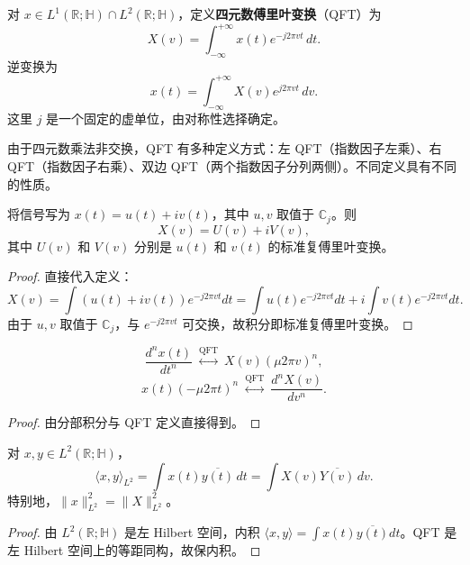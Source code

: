 \begin{definition}[四元数傅里叶变换]\label{def:q_fourier}
对 $x\in L^1(\mathbb{R};\mathbb{H})\cap L^2(\mathbb{R};\mathbb{H})$，定义\textbf{四元数傅里叶变换}（QFT）为
\[
X(v)=\int_{-\infty}^{+\infty}x(t)e^{-j2\pi vt}\,dt.
\]
逆变换为
\[
x(t)=\int_{-\infty}^{+\infty}X(v)e^{j2\pi vt}\,dv.
\]
这里 $j$ 是一个固定的虚单位，由对称性选择确定。
\end{definition}

\begin{remark}\label{rem:q_fourier_types}
由于四元数乘法非交换，QFT 有多种定义方式：左 QFT（指数因子左乘）、右 QFT（指数因子右乘）、双边 QFT（两个指数因子分列两侧）。不同定义具有不同的性质。
\end{remark}

\begin{proposition}\label{prop:q_fourier_complex_relation}
将信号写为 $x(t)=u(t)+iv(t)$，其中 $u,v$ 取值于 $\mathbb{C}_j$。则
\[
X(v)=U(v)+iV(v),
\]
其中 $U(v)$ 和 $V(v)$ 分别是 $u(t)$ 和 $v(t)$ 的标准复傅里叶变换。
\end{proposition}

\begin{proof}
直接代入定义：
\[
X(v)=\int(u(t)+iv(t))e^{-j2\pi vt}dt=\int u(t)e^{-j2\pi vt}dt+i\int v(t)e^{-j2\pi vt}dt.
\]
由于 $u,v$ 取值于 $\mathbb{C}_j$，与 $e^{-j2\pi vt}$ 可交换，故积分即标准复傅里叶变换。
\end{proof}

\begin{theorem}\label{thm:q_fourier_derivative}
\[
\frac{d^n x(t)}{dt^n}\ \overset{\text{QFT}}{\longleftrightarrow}\ X(v)(\mu 2\pi v)^n,
\]
\[
x(t)(-\mu 2\pi t)^n\ \overset{\text{QFT}}{\longleftrightarrow}\ \frac{d^n X(v)}{dv^n}.
\]
\end{theorem}

\begin{proof}
由分部积分与 QFT 定义直接得到。
\end{proof}

\begin{theorem}\label{thm:q_parseval}
对 $x,y\in L^2(\mathbb{R};\mathbb{H})$，
\[
\langle x,y\rangle_{L^2}=\int x(t)\overline{y(t)}\,dt=\int X(v)\overline{Y(v)}\,dv.
\]
特别地，$\|x\|_{L^2}^2=\|X\|_{L^2}^2$。
\end{theorem}

\begin{proof}
由 $L^2(\mathbb{R};\mathbb{H})$ 是左 Hilbert 空间，内积 $\langle x,y\rangle=\int x(t)\overline{y(t)}dt$。QFT 是左 Hilbert 空间上的等距同构，故保内积。
\end{proof}

